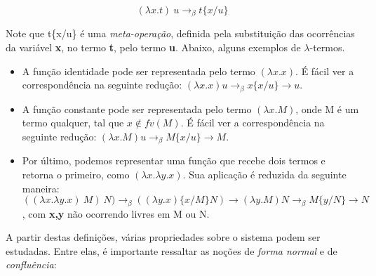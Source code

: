 \[ (\lambda x.t)\ u \rightarrow_{\beta} t\{x/u\} \]

Note que t\{x/u\} é uma \textit{meta-operação}, definida pela substituição das
ocorrências da variável \textbf{x}, no termo \textbf{t}, pelo termo \textbf{u}.
Abaixo, alguns exemplos de $\lambda$-termos.

\begin{itemize}
    \item A função identidade pode ser representada pelo termo $ (\lambda x. x) $.
        É fácil ver a correspondência na seguinte redução: $ (\lambda x.x) u
    \rightarrow_\beta x \{x/u\} \rightarrow u $. 
    \item A função constante pode ser representada pelo termo $ (\lambda x. M) $,
        onde M é um termo qualquer, tal que $x \notin fv(M)$.
        É fácil ver a correspondência na seguinte redução: $ (\lambda x.M) u
    \rightarrow_\beta M \{x/u\} \rightarrow M $. 
    \item Por último, podemos representar uma função que recebe dois termos e
        retorna o primeiro, como $ (\lambda x. \lambda y. x)$. Sua aplicação é
        reduzida da seguinte maneira: $ ((\lambda x. \lambda y. x)\ M)\ N)
    \rightarrow_\beta ((\lambda y. x) \{x/M\} N) \rightarrow (\lambda y. M) N
    \rightarrow_\beta M \{y/N\} \rightarrow N$, com \textbf{x,y} não ocorrendo 
    livres em M ou N.
\end{itemize}



A partir destas definições, várias propriedades sobre o sistema podem ser
estudadas. Entre elas, é importante ressaltar as noções de \textit{forma
 normal} e de \textit{confluência}:

